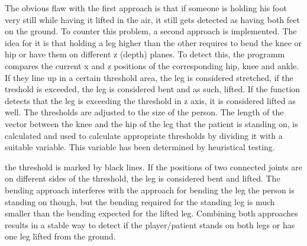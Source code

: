 The obvious flaw with the first approach is that if someone is holding his foot very still while having it lifted in the air, it still gets detected as having both feet on the ground. To counter this problem, a second approach is implemented. The idea for it is that holding a leg higher than the other requires to bend the knee or hip or have them on different z (depth) planes. To detect this, the programm compares the current x and z positions of the corresponding hip, knee and ankle. If they line up in a certain threshold area, the leg is considered stretched, if the treshold is exceeded, the leg is considered bent and as such, lifted. If the function detects that the leg is exceeding the threshold in z axis, it is considered lifted as well. The thresholds are adjusted to the size of the person. The length of the vector between the knee and the hip of the leg that the patient is standing on, is calculated and used to calculate appropriate thresholds by dividing it with a suitable variable. This variable has been determined by heuristical testing.

the threshold is marked by black lines. If the positions of two connected joints are on different sides of the threshold, the leg is considered bent and lifted. The bending approach interferes with the approach for bending the leg the person is standing on though, but the bending required for the standing leg is much smaller than the bending expected for the lifted leg.
Combining both approaches results in a stable way to detect if the player/patient stands on both legs or has one leg lifted from the ground.

